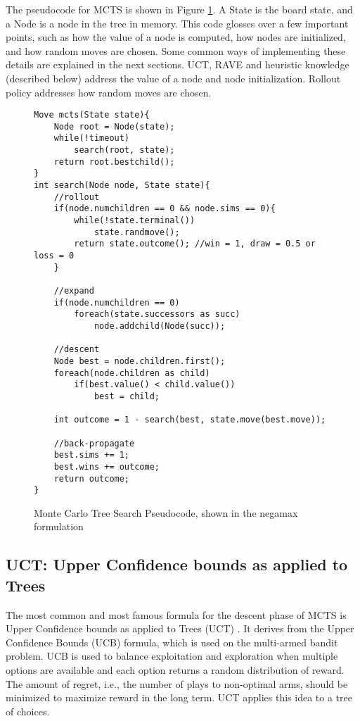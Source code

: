 The pseudocode for MCTS is shown in Figure \ref{fig:mctscode}. A State is the board state, and a Node is a node in the tree in memory. This code glosses over a few important points, such as how the value of a node is computed, how nodes are initialized, and how random moves are chosen. Some common ways of implementing these details are explained in the next sections. UCT, RAVE and heuristic knowledge (described below) address the value of a node and node initialization. Rollout policy addresses how random moves are chosen.

\begin{figure}

\begin{lstlisting}
Move mcts(State state){
	Node root = Node(state);
	while(!timeout)
		search(root, state);
	return root.bestchild();
}
int search(Node node, State state){
	//rollout
	if(node.numchildren == 0 && node.sims == 0){
		while(!state.terminal())
			state.randmove();
		return state.outcome(); //win = 1, draw = 0.5 or loss = 0
	}

	//expand
	if(node.numchildren == 0)
		foreach(state.successors as succ)
			node.addchild(Node(succ));

	//descent
	Node best = node.children.first();
	foreach(node.children as child)
		if(best.value() < child.value())
			best = child;

	int outcome = 1 - search(best, state.move(best.move));

	//back-propagate
	best.sims += 1;
	best.wins += outcome;
	return outcome;
}
\end{lstlisting}

\caption[Monte Carlo Tree Search Pseudocode]{Monte Carlo Tree Search Pseudocode, shown in the negamax formulation}
\label{fig:mctscode}
\end{figure}


\subsection{UCT: Upper Confidence bounds as applied to Trees}\label{sec:uct}

The most common and most famous formula for the descent phase of MCTS is Upper Confidence bounds as applied to Trees (UCT) \cite{kocsis2006uct}. It derives from the Upper Confidence Bounds (UCB) formula, which is used on the multi-armed bandit problem. UCB is used to balance exploitation and exploration when multiple options are available and each option returns a random distribution of reward. The amount of regret, i.e., the number of plays to non-optimal arms, should be minimized to maximize reward in the long term. UCT applies this idea to a tree of choices.

